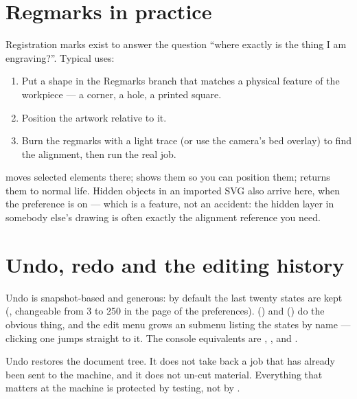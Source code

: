 \section{Regmarks in practice}

Registration marks exist to answer the question ``where exactly is the thing I am
engraving?''. Typical uses:

\begin{enumerate}[leftmargin=1.6em]
  \item Put a shape in the Regmarks branch that matches a physical feature of the
        workpiece --- a corner, a hole, a printed square.
  \item Position the artwork relative to it.
  \item Burn the regmarks with a light trace (or use the camera's bed overlay) to
        find the alignment, then run the real job.
\end{enumerate}

\noindent {} moves selected elements there;
 shows them so you can position them;
 returns them to normal life. Hidden objects in an
imported SVG also arrive here, when the 
preference is on --- which is a feature, not an accident: the hidden layer in
somebody else's drawing is often exactly the alignment reference you need.

\section{Undo, redo and the editing history}

Undo is snapshot-based and generous: by default the last twenty states are kept
(, changeable from 3 to 250 in the  page of
the preferences).  () and 
() do the obvious thing, and the edit menu grows an
 submenu listing the states by name --- clicking one jumps
straight to it. The console equivalents are , ,
 and .

\begin{notebox}
Undo restores the document tree. It does not take back a job that has already
been sent to the machine, and it does not un-cut material. Everything that
matters at the machine is protected by testing, not by .
\end{notebox}

